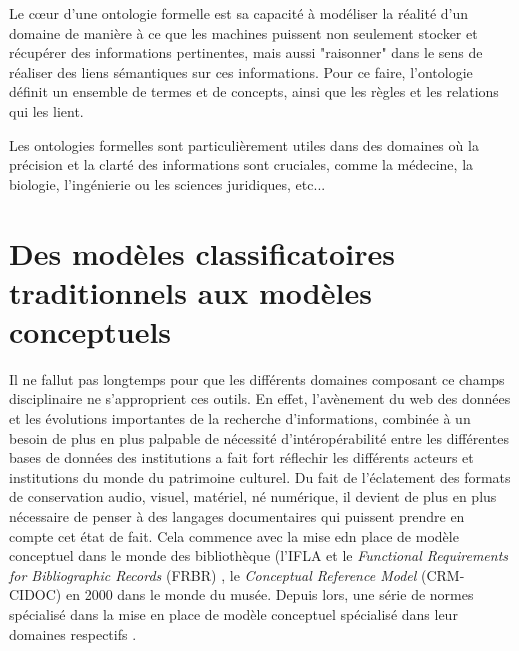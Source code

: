 \documentclass[12pt]{report}
\begin{document}
Le cœur d'une ontologie formelle est sa capacité à modéliser la réalité d'un domaine de manière à ce que les machines puissent non seulement stocker et récupérer des informations pertinentes, mais aussi "raisonner" dans le sens de réaliser des liens sémantiques sur ces informations. Pour ce faire, l'ontologie définit un ensemble de termes et de concepts, ainsi que les règles et les relations qui les lient. 

Les ontologies formelles sont particulièrement utiles dans des domaines où la précision et la clarté des informations sont cruciales, comme la médecine, la biologie, l'ingénierie ou les sciences juridiques, etc...

\newpage
\section{Des modèles classificatoires traditionnels aux modèles conceptuels}
Il ne fallut pas longtemps pour que les différents domaines composant ce champs disciplinaire ne s'approprient ces outils. En effet, l'avènement du web des données et les évolutions importantes de la recherche d'informations, combinée à un besoin de plus en plus palpable de nécessité d'intéropérabilité entre les différentes bases de données des institutions a fait fort réflechir les différents acteurs et institutions du monde du patrimoine culturel. Du fait de l'éclatement des formats de conservation audio, visuel, matériel, né numérique, il devient de plus en plus nécessaire de penser à des langages documentaires qui puissent prendre en compte cet état de fait. 
Cela commence avec la mise edn place de modèle conceptuel dans le monde des bibliothèque (l'IFLA et le \textit{Functional Requirements for Bibliographic Records} (FRBR)\autocite{IFLA1997Functional} , le \textit{Conceptual Reference Model} (CRM-CIDOC) en 2000 dans le monde du musée. Depuis lors, une série de normes spécialisé dans la mise en place de modèle conceptuel spécialisé dans leur domaines respectifs\autocite{Koch2021Moving, LlanesPadron2023RiC-CM} . 
\end{document}
